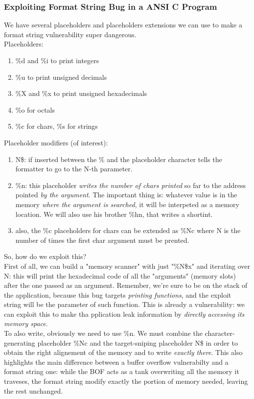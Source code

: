 \documentclass{article}
\begin{document}
				\subsubsection{Exploiting Format String Bug in a ANSI C Program}
					We have several placeholders and placeholders extensions we can use to make a format string vulnerability super dangerous.\\
					Placeholders:
					\begin{enumerate}
						\item \%d and \%i to print integers
						\item \%u to print unsigned decimals
						\item \%X and \%x to print unsigned hexadecimals
						\item \%o for octals
						\item \%c for chars, \%s for strings
					\end{enumerate}
					Placeholder modifiers (of interest):
					\begin{enumerate}
						\item N\$: if inserted between the \% and the placeholder character tells the formatter to go to the N-th parameter.
						\item \%n: this placeholder \emph{writes the number of chars printed} so far to the address pointed \emph{by the argument}. The important thing is: whatever value is in the memory \emph{where the argument is searched}, it will be interpeted as a memory location. We will also use his brother \%hn, that writes a shortint.
						\item also, the \%c placeholders for chars can be extended as \%Nc where N is the number of times the first char argument must be prented.
					\end{enumerate}
					So, how do we exploit this?\\
					First of all, we can build a "memory scanner" with just "\%N\$x" and iterating over N: this will print the hexadecimal code of all the "arguments" (memory slots) after the one passed as an argument. Remember, we're sure to be on the stack of the application, because this bug targets \emph{printing functions}, and the exploit string will be the parameter of such function. This is already a vulnerability: we can exploit this to make tha pplication leak information by \emph{directly accessing its memory space}.\\
					To also write, obviously we need to use \%n. We must combine the character-generating placeholder \%Nc and the target-sniping placeholder N\$ in order to obtain the right alignement of the memory and to write \emph{exactly there}. This also highlights the main difference between a buffer overflow vulnerabilty and a format string one: while the BOF acts as a tank overwriting all the memory it traveses, the format string modify exactly the portion of memory needed, leaving the rest unchanged. 
					
\end{document}

